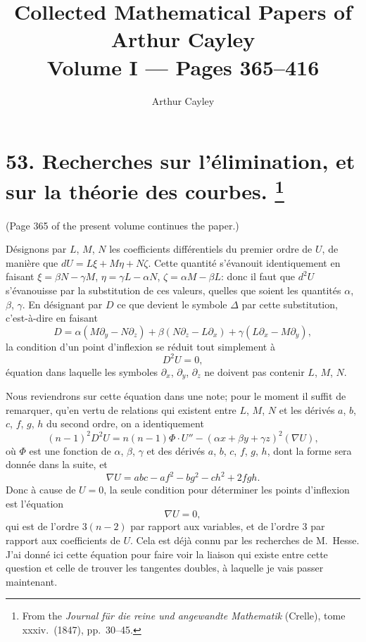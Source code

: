 \documentclass[11pt,a4paper]{article}
\title{Collected Mathematical Papers of Arthur Cayley\\Volume I --- Pages 365--416}
\author{Arthur Cayley}
\date{}
\theoremstyle{plain}
\theoremstyle{definition}
\begin{document}
\maketitle
\tableofcontents
\newpage


\section[Researches on Elimination, and on the Theory of Curves]{%
53. Recherches sur l'\'{e}limination, et sur la th\'{e}orie des courbes.%
\footnote{From the \textit{Journal f\"{u}r die reine und angewandte Mathematik} (Crelle), tome xxxiv.\ (1847), pp.~30--45.}}

(Page 365 of the present volume continues the paper.)

D\'{e}signons par $L$, $M$, $N$ les coefficients diff\'{e}rentiels du premier ordre de
$U$, de mani\`{e}re que $dU = L\xi + M\eta + N\zeta$.
Cette quantit\'{e} s'\'{e}vanouit identiquement en faisant
$\xi = \beta N - \gamma M$, $\eta = \gamma L - \alpha N$, $\zeta = \alpha M - \beta L$:
donc il faut que $d^2U$ s'\'{e}vanouisse par la substitution de ces valeurs,
quelles que soient les quantit\'{e}s $\alpha$, $\beta$, $\gamma$.
En d\'{e}signant par $D$ ce que devient le symbole $\Delta$ par cette substitution,
c'est-\`{a}-dire en faisant
\[
D = \alpha(M\partial_y - N\partial_z) + \beta(N\partial_z - L\partial_x) + \gamma(L\partial_x - M\partial_y),
\]
la condition d'un point d'inflexion se r\'{e}duit tout simplement \`{a}
\[
D^2U = 0,
\]
\'{e}quation dans laquelle les symboles $\partial_x$, $\partial_y$, $\partial_z$ ne doivent pas contenir
$L$, $M$, $N$.

Nous reviendrons sur cette \'{e}quation dans une note; pour le moment il suffit de remarquer,
qu'en vertu de relations qui existent entre $L$, $M$, $N$ et les d\'{e}riv\'{e}s
$a$, $b$, $c$, $f$, $g$, $h$ du second ordre, on a identiquement
\[
(n-1)^2 D^2U = n(n-1)\Phi \cdot U'' - (\alpha x + \beta y + \gamma z)^2 (\nabla U),
\]
o\`{u} $\Phi$ est une fonction de $\alpha$, $\beta$, $\gamma$ et des d\'{e}riv\'{e}s
$a$, $b$, $c$, $f$, $g$, $h$, dont la forme sera donn\'{e}e dans la suite, et
\[
\nabla U = abc - af^2 - bg^2 - ch^2 + 2fgh.
\]
Donc \`{a} cause de $U = 0$, la seule condition pour d\'{e}terminer les points d'inflexion est
l'\'{e}quation
\[
\nabla U = 0,
\]
qui est de l'ordre $3(n-2)$ par rapport aux variables, et de l'ordre 3 par rapport aux
coefficients de $U$. Cela est d\'{e}j\`{a} connu par les recherches de M.~Hesse.
J'ai donn\'{e} ici cette \'{e}quation pour faire voir la liaison qui existe entre cette question
et celle de trouver les tangentes doubles, \`{a} laquelle je vais passer maintenant.
\end{document}
